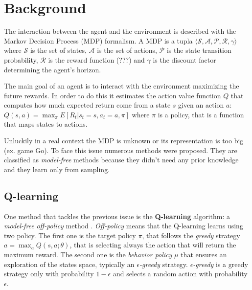 \section{Background}


The interaction between the agent and the environment is described  with the
Markov Decision Process (MDP) formalism. A MDP is a tupla $\langle \mathcal{S}, 
\mathcal{A}, \mathcal{P}, \mathcal{R}, \gamma \rangle$ where $\mathcal{S}$ is
the set of states, $\mathcal{A}$ is the set of actions, $\mathcal{P}$ is the 
state transition probability, $\mathcal{R}$ is the reward function (???) and 
$\gamma$ is the discount factor determining the agent's horizon.

The main goal of an agent is to interact with the environment maximizing the future rewards. In order to do this it estimates the action value function $Q$ that computes how much expected return come from a state $s$ given an action $a$: $Q(s, a) = \max_\pi E[R_t | s_t = s, a_t = a, \pi]$ where $\pi$ is a policy, that is a function that maps states to actions.


Unluckily in a real context the MDP is unknown or its representation is too big
(ex. game Go). To face this issue numerous methods were proposed. They are 
classified as \textit{model-free} methods because they didn't need any prior knowledge and they learn only from sampling.


\subsection{Q-learning}

One method that tackles the previous issue is the \textbf{Q-learning} algorithm: a \textit{model-free} \textit{off-policy} method \cite{Watkins1992}. 
\textit{Off-policy} means that the Q-learning learns using two policy. The first one is the target policy $\pi$, that follows the \textit{greedy} strategy $a = \max_a Q(s, a; \theta)$, that is selecting always the action that will return the maximum reward.
The second one is the \textit{behavior policy} $\mu$ that ensures an exploration of the states space, typically an \textit{$\epsilon$-greedy} strategy. \textit{$\epsilon$-greedy} is a greedy strategy only with probability $1 - \epsilon$ and selects a random action with probability $\epsilon$.

